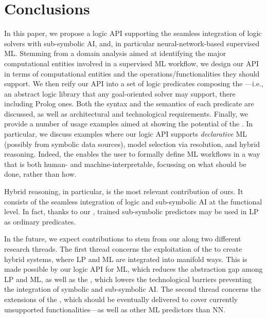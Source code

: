 \documentclass[runningheads]{llncs}
\begin{document}


\section{Conclusions}
\label{sec:conclusions}

In this paper, we propose a logic API supporting the seamless integration of logic solvers with sub-symbolic AI, and, in particular neural-network-based supervised ML.
%
Stemming from a domain analysis aimed at identifying the major computational entities involved in a supervised ML workflow, we design our API in terms of computational entities and the operations/functionalities they should support.
%
We then reify our API into a set of logic predicates composing the \mllib{}---i.e., an abstract logic library that any goal-oriented solver may support, there including Prolog ones.
%
Both the syntax and the semantics of each predicate are discussed, as well as architectural and technological requirements.
%
Finally, we provide a number of usage examples aimed at showing the potential of the \mllib.
%
In particular, we discuss examples where our logic API supports \emph{declarative} ML (possibly from symbolic data sources), model selection via resolution, and hybrid reasoning.
%
Indeed, the \mllib{} enables the user to formally define ML workflows in a way that is both human- and machine-interpretable, focussing on what should be done, rather than how.

Hybrid reasoning, in particular, is the most relevant contribution of ours.
%
It consists of the seamless integration of logic and sub-symbolic AI at the functional level.
%
In fact, thanks to our \mllib{}, trained sub-symbolic predictors may be used in LP as ordinary predicates.


In the future, we expect contributions to stem from our \mllib{} along two different research threads.
%
The first thread concerns the exploitation of the \mllib{} to create hybrid systems, where LP and ML are integrated into manifold ways.
%
This is made possible by our logic API for ML, which reduces the abstraction gap among LP and ML, as well as the \mllib, which lowers the technological barriers preventing the integration of symbolic and sub-symbolic AI.
%
The second thread concerns the extensions of the \mllib{}, which should be eventually delivered to cover currently unsupported functionalities---as well as other ML predictors than NN.
\end{document}
